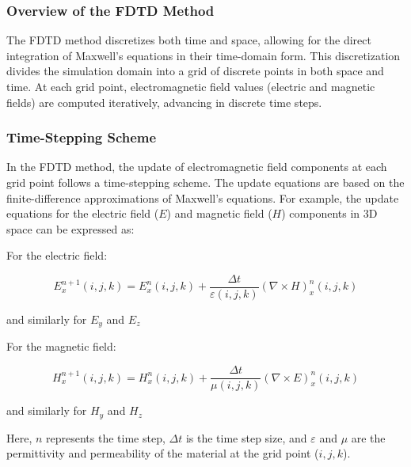 \documentclass[11pt, a4paper, titlepage]{article}
\begin{document}
\subsubsection{Overview of the FDTD Method}

The FDTD method discretizes both time and space, allowing for the direct integration of Maxwell's equations in their time-domain form. This discretization divides the simulation domain into a grid of discrete points in both space and time. At each grid point, electromagnetic field values (electric and magnetic fields) are computed iteratively, advancing in discrete time steps.

\subsubsection{Time-Stepping Scheme}

In the FDTD method, the update of electromagnetic field components at each grid point follows a time-stepping scheme. The update equations are based on the finite-difference approximations of Maxwell's equations. For example, the update equations for the electric field (\(E\)) and magnetic field (\(H\)) components in 3D space can be expressed as:

\begin{center} For the electric field: \end{center}
\[
E_x^{n+1}(i,j,k) = E_x^n(i,j,k) + \frac{\Delta t}{\varepsilon(i,j,k)} \left(\nabla \times H\right)_x^n(i,j,k)
\]
\begin{center}and similarly for  $E_y$ and $E_z$\end{center}



\begin{center}For the magnetic field:\end{center}
\[
H_x^{n+1}(i,j,k) = H_x^n(i,j,k) + \frac{\Delta t}{\mu(i,j,k)} \left(\nabla \times E\right)_x^n(i,j,k)
\]
 \begin{center}and similarly for $H_y$ and $H_z$\end{center}
 
 
Here, \(n\) represents the time step, \(\Delta t\) is the time step size, and \(\varepsilon\) and \(\mu\) are the permittivity and permeability of the material at the grid point (\(i, j, k\)).
\newpage
\end{document}
